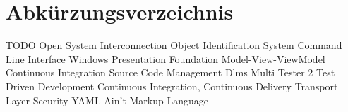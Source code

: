 \renewcommand{\chaptermark}[1]{\markboth{\spacedlowsmallcaps{#1}}{\spacedlowsmallcaps{#1}}}
\renewcommand{\sectionmark}[1]{\markright{\thesection\enspace\spacedlowsmallcaps{#1}}}
\chapter*{Abk\"{u}rzungsverzeichnis}

\begin{acronym}[UML]
   {TODO}
   {Open System Interconnection}
   {Object Identification System}
   {Command Line Interface}
   {Windows Presentation Foundation}
   {Model-View-ViewModel}
   {Continuous Integration}
   {Source Code Management}
   {Dlms Multi Tester 2}
   {Test Driven Development}
   {Continuous Integration, Continuous Delivery}
   {Transport Layer Security}
   {YAML Ain't Markup Language}
  
\end{acronym}

\cleardoublepage
